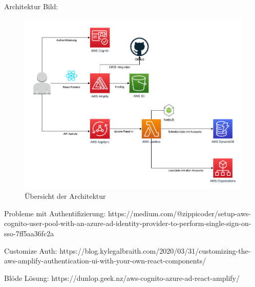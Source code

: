 Architektur Bild:

\begin{figure}[htbp]
    \centering
    \includegraphics[width=1.0\textwidth]{50-Implementierung/Architektur.png}
    \caption{Übersicht der Architektur}
    \label{fig:meine-grafik}
\end{figure}


Probleme mit Authentifizierung: https://medium.com/@zippicoder/setup-aws-cognito-user-pool-with-an-azure-ad-identity-provider-to-perform-single-sign-on-sso-7ff5aa36fc2a

Customize Auth: https://blog.kylegalbraith.com/2020/03/31/customizing-the-aws-amplify-authentication-ui-with-your-own-react-components/

Blöde Lösung: https://dunlop.geek.nz/aws-cognito-azure-ad-react-amplify/
